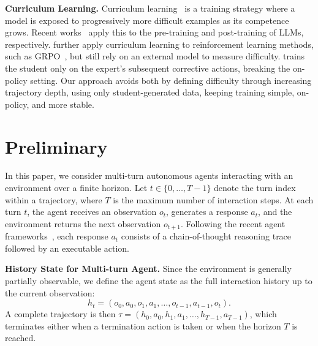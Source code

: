 \documentclass{article} %
\newcommand{\todo}[1]{\textcolor{red}{\textbf{TODO:} #1}}
\begin{document}
\textbf{Curriculum Learning.}
Curriculum learning~\citep{bengio2009curriculum} is a training strategy where a model is exposed to progressively more difficult examples as its competence grows. 
Recent works~\citep{zhang2026beyond, wang2025dump} apply this to the pre-training and post-training of LLMs, respectively. 
\citet{shi2025efficient, wang2025practitioner,gong2026temp} further apply curriculum learning to reinforcement learning methods, such as GRPO~\cite{Guo_2025}, but still rely on an external model to measure difficulty.
\citet{lauffer2025imitation} trains the student only on the expert's subsequent corrective actions, breaking the on-policy setting.
Our approach avoids both by defining difficulty through increasing trajectory depth, using only student-generated data, keeping training simple, on-policy, and more stable.



\section{Preliminary}

In this paper, we consider multi-turn autonomous agents interacting with an 
environment over a finite horizon. Let $t \in \{0, \dots, T-1\}$ 
denote the turn index within a trajectory, where $T$ is the maximum 
number of interaction steps. At each turn $t$, the agent receives an 
observation $o_t$, generates a response $a_t$, and the environment 
returns the next observation $o_{t+1}$. 
Following the recent agent frameworks~\citep{wang2025thinknotselectivereasoning}, each response $a_t$ consists of a chain-of-thought 
reasoning trace followed by an executable action.

\textbf{History State for Multi-turn Agent.} Since the environment is generally partially observable, we define the 
agent state as the full interaction history up to the current 
observation:
\begin{equation}
    h_t = (o_0, a_0, o_1, a_1, \dots, o_{t-1}, a_{t-1}, o_t).
\end{equation}
A complete trajectory is then $\tau = (h_0, a_0, h_1, a_1, \dots, 
h_{T-1}, a_{T-1})$, which terminates either when a termination action 
is taken or when the horizon $T$ is reached.
\end{document}
